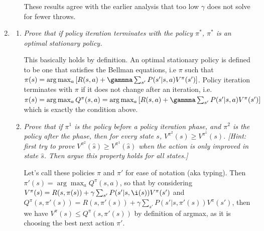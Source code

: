 \documentclass{article}
\begin{document}
\begin{enumerate}
\begin{enumerate}
    These results agree with the earlier analysis that too low
    $\gamma$ does not solve for fewer throws.
  \end{enumerate}

\item 
  \begin{enumerate}
  \item \emph{Prove that if policy iteration terminates with the
    policy $\pi^*$, $\pi^*$ is an optimal stationary policy.}

    This basically holds by definition. An optimal stationary policy
    is defined to be one that satisfies the Bellman equations, i.e
    $\pi$ such that $\pi(s)=\arg\max_{a} \left[R(s,a)+\gammma
      \sum_{s'} P(s'|s,a)V^{\pi}(s')\right]$.  Policy iteration
    terminates with $\pi$ if it does not change after an iteration,
    i.e.  $\pi(s)=\arg\max_a Q^\pi (s,a)=\arg\max_a
    \left[R(s,a)+\gammma \sum_{s'} P(s'|s,a)V^{\pi}(s')\right]$ which
    is exactly the condition above.



  \item \emph{Prove that if $\pi^1$ is the policy before a policy
    iteration phase, and $\pi^2$ is the policy after the phase, then
    for every state $s$, $V^{\pi^2}(s)\geq V^{\pi^1}(s)$. [Hint: first
      try to prove $V^{\pi^2}(\hat s)\geq V^{\pi^1}(\hat s)$ when the
      action is only improved in state $\hat s$. Then argue this
      property holds for all states.]}

    Let's call these policies $\pi$ and $\pi'$ for ease of notation
    (aka typing).  Then $\pi'(s)=\arg\max_a Q^\pi (s,a)$, so that by
    considering $V^\pi(s)=R(s,\pi(s))+\gamma
    \sum_{s'}P(s'|s,\i(s))V^\pi(s')$ and
    $Q^\pi(s,\pi'(s))=R(s,\pi'(s))+\gamma \sum_{s'} P(s'|s,\pi'(s))
    V^\pi(s')$, then we have $V^\pi(s)\leq Q^\pi(s,\pi'(s))$ by
    definition of argmax, as it is choosing the best next action
    $\pi'$.


\end{enumerate}
\end{enumerate}
\end{document}
